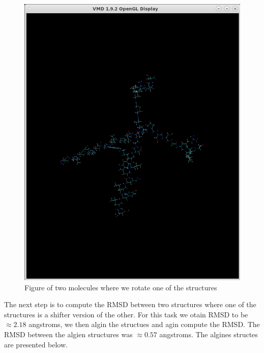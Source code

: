 \documentclass[11pt]{article}
\makeatletter
\def\maxwidth{\ifdim\Gin@nat@width>\linewidth\linewidth
    \else\Gin@nat@width\fi}
\let\Oldincludegraphics\includegraphics
\renewcommand{\includegraphics}[1]{\Oldincludegraphics[width=.8\maxwidth]{#1}}
\makeatother
\begin{document}
\begin{figure}
\centering
\includegraphics{Screenshot_rotate_one.png}
\caption{Figure of two molecules where we rotate one of the structures}
\end{figure}

The next step is to compute the RMSD between two structures where one of
the structures is a shifter version of the other. For this task we otain
RMSD to be \(\approx 2.18\) angstroms, we then algin the structues and
agin compute the RMSD. The RMSD between the algien structures was
\(\approx 0.57\) angstroms. The algines structes are presented below.
\end{document}
